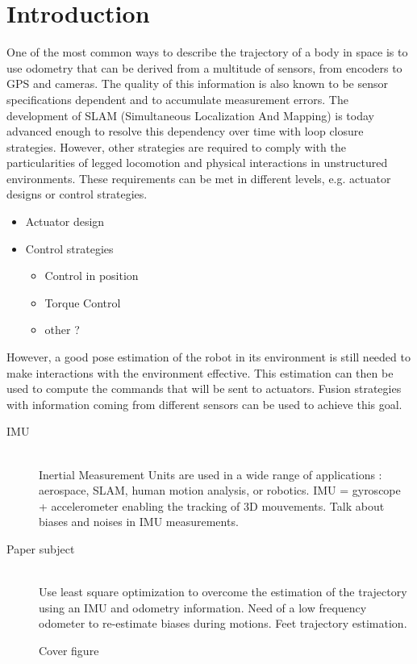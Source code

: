 
\section{Introduction}\label{sec:intro}

One of the most common ways to describe the trajectory of a body in space is to use odometry that can be derived from a multitude of sensors, from encoders to GPS and cameras.
The quality of this information is also known to be sensor specifications dependent and to accumulate measurement errors. The development of SLAM (Simultaneous Localization And Mapping) is today advanced enough to resolve 
this dependency over time with loop closure strategies. However, other strategies are required to comply with the particularities of legged locomotion and physical interactions in unstructured environments. These requirements can be met in 
different levels, e.g. actuator designs or control strategies.

  \begin{itemize}
   \item Actuator design  \cite{wensing2017proprioceptive}
   \item Control strategies
    \begin{itemize}
     \item Control in position
     \item Torque Control
     \item other ?
    \end{itemize}
  \end{itemize}

However, a good pose estimation of the robot in its environment is still needed to make interactions with the environment effective. This estimation can then be used to compute the commands that will be sent to actuators.
Fusion strategies with information coming from different sensors can be used to achieve this goal. 

\begin{description}
 \item [IMU] \hfill \\ Inertial Measurement Units are used in a wide range of applications : aerospace, SLAM, human motion analysis, or robotics. IMU = gyroscope + accelerometer enabling the tracking of 3D mouvements. 
			Talk about biases and noises in IMU measurements.
 \item [Paper subject] \hfill \\ Use least square optimization to overcome the estimation of the trajectory using an IMU and odometry information. Need of a low frequency odometer to re-estimate biases during motions. Feet trajectory estimation.
\end{description}


\begin{figure}
\centering
	\caption{Cover figure}
	\label{fig:cover}
\end{figure}

